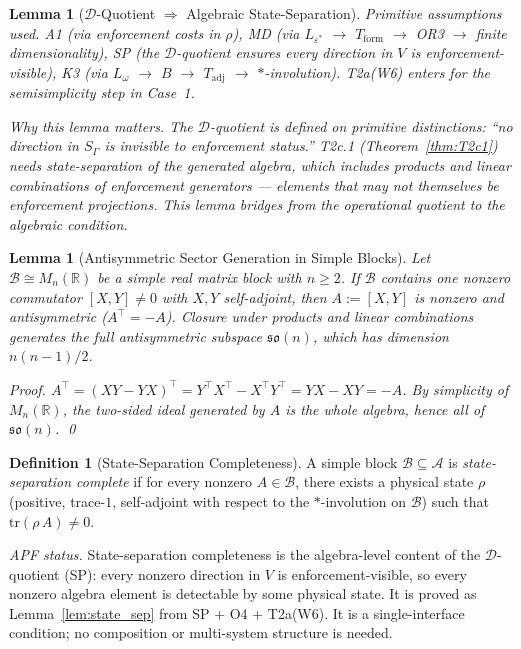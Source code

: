 \documentclass[11pt,a4paper]{article}
\newtheorem{lemma}[theorem]{Lemma}
\theoremstyle{definition}
\newtheorem{definition}[theorem]{Definition}
\newcommand{\eps}{\varepsilon}
\newcommand{\tr}{\mathrm{tr}}
\begin{document}
\begin{lemma}[$\mathcal{D}$-Quotient $\Rightarrow$ Algebraic State-Separation]
\smallskip\noindent\textit{Primitive assumptions used.}  A1 (via enforcement costs in $\rho$), MD (via $L_{\eps^*}$ $\to$ $T_{\mathrm{form}}$ $\to$ OR3 $\to$ finite dimensionality), SP (the $\mathcal{D}$-quotient ensures every direction in $V$ is enforcement-visible), K3 (via $L_\omega$ $\to$ $B$ $\to$ $T_{\mathrm{adj}}$ $\to$ $*$-involution).  T2a(W6) enters for the semisimplicity step in Case~1.

\smallskip\noindent\textit{Why this lemma matters.}  The $\mathcal{D}$-quotient is defined on primitive distinctions: ``no direction in $S_\Gamma$ is invisible to enforcement status.''  T2c.1 (Theorem~\ref{thm:T2c1}) needs state-separation of the \emph{generated algebra}, which includes products and linear combinations of enforcement generators --- elements that may not themselves be enforcement projections.  This lemma bridges from the operational quotient to the algebraic condition.
\end{lemma}

\begin{lemma}[Antisymmetric Sector Generation in Simple Blocks]\label{lem:antisym}
Let $\mathcal{B} \cong M_n(\mathbb{R})$ be a simple real matrix block with $n \ge 2$.  If $\mathcal{B}$ contains one nonzero commutator $[X,Y] \ne 0$ with $X, Y$ self-adjoint, then $A := [X,Y]$ is nonzero and antisymmetric ($A^\top = -A$).  Closure under products and linear combinations generates the full antisymmetric subspace $\mathfrak{so}(n)$, which has dimension $n(n-1)/2$.

\smallskip\noindent\textit{Proof.}
$A^\top = (XY - YX)^\top = Y^\top X^\top - X^\top Y^\top = YX - XY = -A$.  By simplicity of $M_n(\mathbb{R})$, the two-sided ideal generated by $A$ is the whole algebra, hence all of $\mathfrak{so}(n)$.  \qed
\end{lemma}

\begin{definition}[State-Separation Completeness]\label{def:SSC}
A simple block $\mathcal{B} \subseteq \mathcal{A}$ is \emph{state-separation complete} if for every nonzero $A \in \mathcal{B}$, there exists a physical state $\rho$ (positive, trace-$1$, self-adjoint with respect to the $*$-involution on $\mathcal{B}$) such that $\tr(\rho\,A) \ne 0$.

\smallskip\noindent\textit{APF status.}  State-separation completeness is the algebra-level content of the $\mathcal{D}$-quotient (SP): every nonzero direction in $V$ is enforcement-visible, so every nonzero algebra element is detectable by some physical state.  It is proved as Lemma~\ref{lem:state_sep} from SP + O4 + T2a(W6).  It is a single-interface condition; no composition or multi-system structure is needed.
\end{definition}
\end{document}
